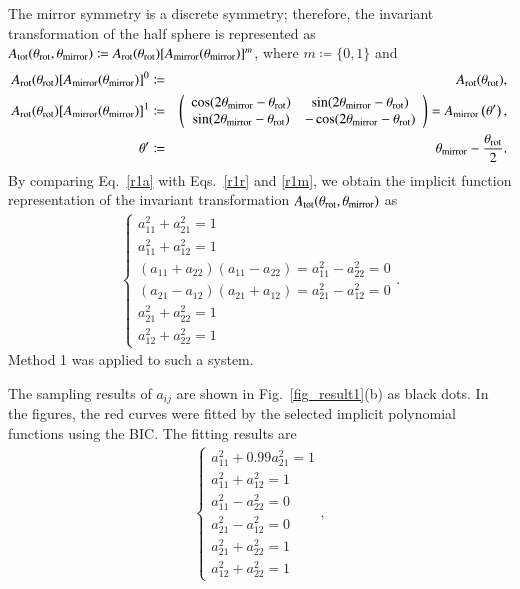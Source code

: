 \documentclass[preprint,
bibnotes,
 amsmath,amssymb,
 aps,
]{revtex4-1}
\begin{document}
The mirror symmetry is a discrete symmetry; therefore, the invariant transformation of the half sphere is represented as
$A_{\rm tot}(\theta_{\rm rot}, \theta_{\rm mirror}) \coloneqq A_{\rm rot}(\theta_{\rm rot}) [A_{\rm mirror}(\theta_{\rm mirror})]^m$, where $m \coloneqq \{0,1\}$ and 
\begin{eqnarray}
\label{r1r}
A_{\rm rot}(\theta_{\rm rot}) [A_{\rm mirror}(\theta_{\rm mirror})]^0 &\coloneqq& A_{\rm rot}(\theta_{\rm rot}),\\
\label{r1m}
A_{\rm rot}(\theta_{\rm rot}) [A_{\rm mirror}(\theta_{\rm mirror})]^1 &\coloneqq& 
\left(
    \begin{array}{cc}
      \cos(2\theta_{\rm mirror} - \theta_{\rm rot}) & \sin(2\theta_{\rm mirror} - \theta_{\rm rot})\\
      \sin(2\theta_{\rm mirror} - \theta_{\rm rot}) & -\cos(2\theta_{\rm mirror} - \theta_{\rm rot})\\
    \end{array}
  \right) = A_{\rm mirror}\left(\theta'\right),\\
  \theta' &\coloneqq& \theta_{\rm mirror} - \frac{\theta_{\rm rot}}{2}.
\end{eqnarray}
By comparing Eq.~\eqref{r1a} with Eqs.~\eqref{r1r} and \eqref{r1m}, we obtain the implicit function representation of the invariant transformation $A_{\rm tot}(\theta_{\rm rot}, \theta_{\rm mirror})$ as
\begin{eqnarray}
  \begin{cases}
a_{11}^2 + a_{21}^2 = 1\\
a_{11}^2 + a_{12}^2 = 1\\
(a_{11} + a_{22})(a_{11} - a_{22}) = a_{11}^2 - a_{22}^2 = 0\\
(a_{21} - a_{12})(a_{21} + a_{12}) = a_{21}^2 - a_{12}^2 = 0\\
a_{21}^2 + a_{22}^2 = 1\\
a_{12}^2 + a_{22}^2 = 1 
\end{cases}.
\end{eqnarray}
Method 1 was applied to such a system. \par
The sampling results of $a_{ij}$ are shown in Fig.~\ref{fig_result1}(b) as black dots. 
In the figures, the red curves were fitted by the selected implicit polynomial functions using the BIC. 
The fitting results are 
\begin{eqnarray}
  \begin{cases}
a_{11}^2 + 0.99a_{21}^2 = 1\\
a_{11}^2 + a_{12}^2 = 1\\
a_{11}^2 - a_{22}^2 = 0\\
a_{21}^2 - a_{12}^2 = 0\\
a_{21}^2 + a_{22}^2 = 1\\
a_{12}^2 + a_{22}^2 = 1 
\end{cases},
\end{eqnarray}
\end{document}
